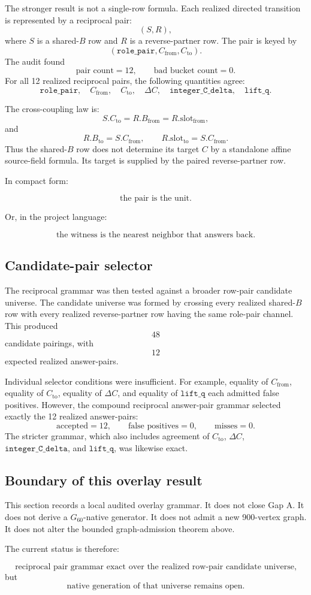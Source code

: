 The stronger result is not a single-row formula. Each realized directed transition is represented by a reciprocal pair:
\[
(S,R),
\]
where \(S\) is a shared-\(B\) row and \(R\) is a reverse-partner row. The pair is keyed by
\[
(\texttt{role\_pair}, C_{\mathrm{from}}, C_{\mathrm{to}}).
\]
The audit found
\[
\text{pair count}=12,
\qquad
\text{bad bucket count}=0.
\]
For all 12 realized reciprocal pairs, the following quantities agree:
\[
\texttt{role\_pair},\quad
C_{\mathrm{from}},\quad
C_{\mathrm{to}},\quad
\Delta C,\quad
\texttt{integer\_C\_delta},\quad
\texttt{lift\_q}.
\]

The cross-coupling law is:
\[
S.C_{\mathrm{to}}=R.B_{\mathrm{from}}=R.\mathrm{slot}_{\mathrm{from}},
\]
and
\[
R.B_{\mathrm{to}}=S.C_{\mathrm{from}},
\qquad
R.\mathrm{slot}_{\mathrm{to}}=S.C_{\mathrm{from}}.
\]
Thus the shared-\(B\) row does not determine its target \(C\) by a standalone affine source-field formula. Its target is supplied by the paired reverse-partner row.

In compact form:

\[
\text{the pair is the unit.}
\]

Or, in the project language:

\[
\text{the witness is the nearest neighbor that answers back.}
\]

\subsection{Candidate-pair selector}

The reciprocal grammar was then tested against a broader row-pair candidate universe. The candidate universe was formed by crossing every realized shared-\(B\) row with every realized reverse-partner row having the same role-pair channel. This produced
\[
48
\]
candidate pairings, with
\[
12
\]
expected realized answer-pairs.

Individual selector conditions were insufficient. For example, equality of \(C_{\mathrm{from}}\), equality of \(C_{\mathrm{to}}\), equality of \(\Delta C\), and equality of \(\texttt{lift\_q}\) each admitted false positives. However, the compound reciprocal answer-pair grammar selected exactly the 12 realized answer-pairs:
\[
\text{accepted}=12,\qquad
\text{false positives}=0,\qquad
\text{misses}=0.
\]
The stricter grammar, which also includes agreement of \(C_{\mathrm{to}}\), \(\Delta C\), \(\texttt{integer\_C\_delta}\), and \(\texttt{lift\_q}\), was likewise exact.

\subsection{Boundary of this overlay result}

This section records a local audited overlay grammar. It does not close Gap A. It does not derive a \(G_{60}\)-native generator. It does not admit a new 900-vertex graph. It does not alter the bounded graph-admission theorem above.

The current status is therefore:

\[
\text{reciprocal pair grammar exact over the realized row-pair candidate universe,}
\]
but
\[
\text{native generation of that universe remains open.}
\]
